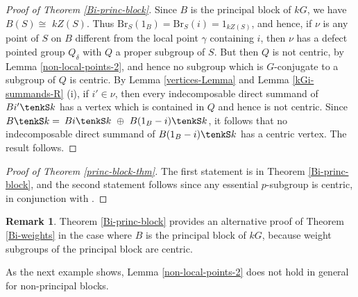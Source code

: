 \documentclass{amsart}
\theoremstyle{plain}\newtheorem{Theorem}{Theorem}[section]
\theoremstyle{plain}\newtheorem{Conjecture}[Theorem]{Conjecture}
\theoremstyle{plain}\newtheorem{Corollary}[Theorem]{Corollary}
\theoremstyle{plain}\newtheorem{Lemma}[Theorem]{Lemma}
\theoremstyle{plain}\newtheorem{Proposition}[Theorem]{Proposition}
\theoremstyle{definition}\newtheorem{Definition}[Theorem]{Definition}
\theoremstyle{definition}\newtheorem{Example}[Theorem]{Example}
\theoremstyle{definition}\newtheorem{Examples}[Theorem]{Examples}
\theoremstyle{definition}\newtheorem{Exercise}[Theorem]{Exercise}
\theoremstyle{definition}\newtheorem{Notation}[Theorem]{Notation}
\theoremstyle{definition}\newtheorem{Remark}[Theorem]{Remark}
\theoremstyle{definition}\newtheorem{Remarks}[Theorem]{Remarks}
\theoremstyle{plain}\newtheorem{Statement}[Theorem]{}
\def\Br{\mathrm{Br}}                 \def\ten{\otimes}
\begin{document}
\begin{proof}[{Proof of Theorem \ref{Bi-princ-block}}]
Since $B$ is the principal block of $kG$, we have $B(S)\cong$ $kZ(S)$.
Thus $\Br_S(1_B)=\Br_S(i)=1_{kZ(S)}$, and hence, if $\nu$ is any point of
$S$ on $B$ different from the local point $\gamma$ containing $i$, then
$\nu$ has a defect pointed group $Q_\delta$ with $Q$ a proper subgroup
of $S$. But then $Q$ is not centric, by Lemma \ref{non-local-points-2},
and hence no subgroup which is $G$-conjugate to a subgroup of $Q$ is
centric.  By Lemma \ref{vertices-Lemma} and Lemma \ref{kGi-summands-R} (i), 
if  $i'\in \nu$, then every indecomposable direct summand of
$Bi'\tenkS k$ has  a vertex which is contained  in $Q$ and hence  is  not centric. 
Since $B\tenkS k=$ $Bi\tenkS k\ \oplus\ B(1_B-i)\tenkS k$, it follows that
no indecomposable direct summand of $B(1_B-i)\tenkS k$ has a
centric vertex.  The result follows.
\end{proof}

\begin{proof}[{Proof of Theorem \ref{princ-block-thm}}]
The first statement is in Theorem \ref{Bi-princ-block}, and the second
statement follows  since any essential $p$-subgroup is centric, in
conjunction with \cite[Theorem 1.2]{Rob88}.
\end{proof}


\begin{Remark}
Theorem \ref{Bi-princ-block}  provides an alternative proof of
Theorem \ref{Bi-weights} in the case where $B$ is the principal
block of $kG$, because weight subgroups of the principal block
are centric.
\end{Remark}

As the next example shows, Lemma \ref{non-local-points-2} does not hold in 
general for non-principal  blocks.
\end{document}
